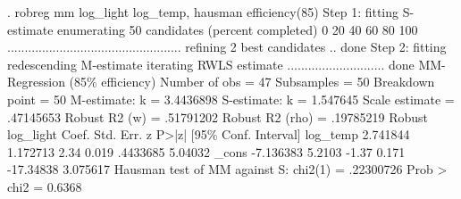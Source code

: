 . robreg mm log_light log_temp, hausman efficiency(85)
{\smallskip}
Step 1: fitting S-estimate
{\smallskip}
enumerating 50 candidates (percent completed)
0  20  40  60  80  100
..................................................
{\smallskip}
refining 2 best candidates .. done
{\smallskip}
Step 2: fitting redescending M-estimate
{\smallskip}
iterating RWLS estimate ............................ done
{\smallskip}
MM-Regression (85\% efficiency)                  Number of obs     =         47
                                                  Subsamples      =         50
                                                  Breakdown point =         50
                                                  M-estimate: k   =  3.4436898
                                                  S-estimate: k   =   1.547645
                                                  Scale estimate  =  .47145653
                                                  Robust R2 (w)   =  .51791202
                                                  Robust R2 (rho) =  .19785219
{\smallskip}
             {\VBAR}               Robust
   log_light {\VBAR}      Coef.   Std. Err.      z    P>|z|     [95\% Conf. Interval]
    log_temp {\VBAR}   2.741844   1.172713     2.34   0.019     .4433685     5.04032
       _cons {\VBAR}  -7.136383     5.2103    -1.37   0.171    -17.34838    3.075617
Hausman test of MM against S:    chi2(1) = .22300726      Prob > chi2 = 0.6368
{\smallskip}
